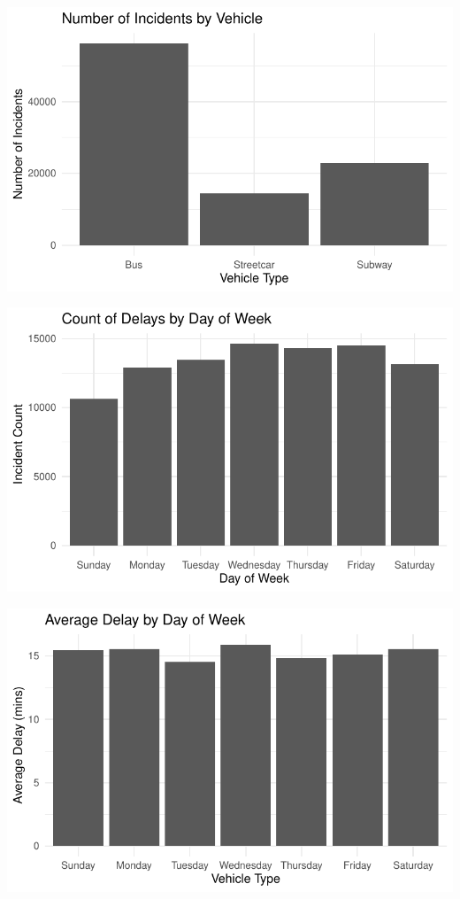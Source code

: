 \documentclass[
  letterpaper,
  DIV=11,
  numbers=noendperiod]{scrartcl}
\begin{document}
\includegraphics{paper_files/figure-pdf/most-incidents-vehicle-1.pdf}

\includegraphics{paper_files/figure-pdf/transport-delay-time-1.pdf}

\includegraphics{paper_files/figure-pdf/transport-delay-number-1.pdf}
\end{document}
